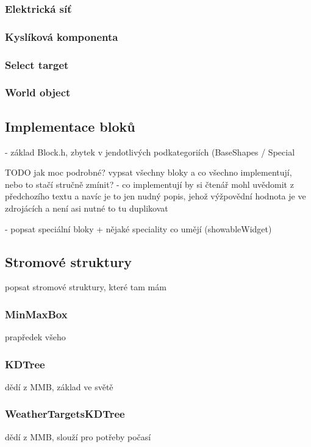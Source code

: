 \subsubsection{Elektrická síť}


\subsubsection{Kyslíková komponenta}


\subsubsection{Select target}


\subsubsection{World object}






\subsection{Implementace bloků}
 - základ Block.h, zbytek v jendotlivých podkategoriích (BaseShapes / Special
 
 TODO jak moc podrobné? vypsat všechny bloky a co všechno implementují, nebo to stačí stručně zmínit? - co implementují by si čtenář mohl uvědomit z předchozího textu a navíc je to jen nudný popis, jehož výžpovědní hodnota je ve zdrojácích a není asi nutné to tu duplikovat

- popsat speciální bloky + nějaké speciality co umějí (showableWidget)


\subsection{Stromové struktury}
popsat stromové struktury, které tam mám


\subsubsection{MinMaxBox}

prapředek všeho



\subsubsection{KDTree}

dědí z MMB, základ ve světě


\subsubsection{WeatherTargetsKDTree}

dědí z MMB, slouží pro potřeby počasí